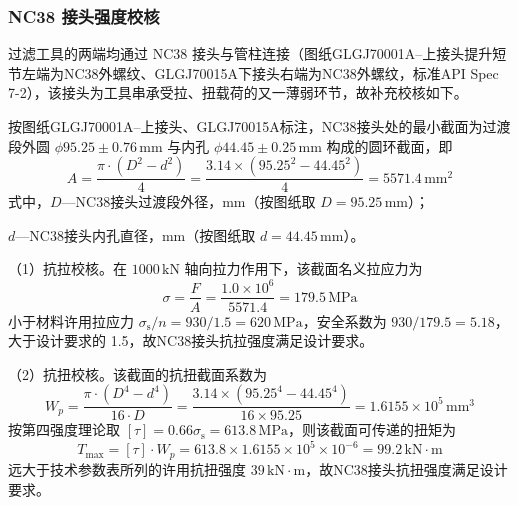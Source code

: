 \subsubsection{NC38 接头强度校核}

过滤工具的两端均通过 NC38 接头与管柱连接（图纸GLGJ70001A--上接头提升短节左端为NC38外螺纹、GLGJ70015A下接头右端为NC38外螺纹，标准API Spec 7-2），该接头为工具串承受拉、扭载荷的又一薄弱环节，故补充校核如下。

按图纸GLGJ70001A--上接头、GLGJ70015A标注，NC38接头处的最小截面为过渡段外圆 $\phi 95.25\pm0.76\,\text{mm}$ 与内孔 $\phi 44.45\pm0.25\,\text{mm}$ 构成的圆环截面，即
\begin{equation}
    A = \frac{\pi \cdot (D^2 - d^2)}{4} = \frac{3.14 \times (95.25^2 - 44.45^2)}{4} = 5571.4\,\text{mm}^2
\end{equation}
式中，$D$---NC38接头过渡段外径，mm（按图纸取 $D = 95.25$\,mm）；

$d$---NC38接头内孔直径，mm（按图纸取 $d = 44.45$\,mm）。

（1）抗拉校核。在 $1000\,\text{kN}$ 轴向拉力作用下，该截面名义拉应力为
\begin{equation}
    \sigma = \frac{F}{A} = \frac{1.0 \times 10^{6}}{5571.4} = 179.5\,\text{MPa}
\end{equation}
小于材料许用拉应力 $\sigma_{\mathrm{s}}/n = 930/1.5 = 620\,\text{MPa}$，安全系数为 $930/179.5 = 5.18$，大于设计要求的 1.5，故NC38接头抗拉强度满足设计要求。

（2）抗扭校核。该截面的抗扭截面系数为
\begin{equation}
    W_p = \frac{\pi \cdot (D^4 - d^4)}{16 \cdot D} = \frac{3.14 \times (95.25^4 - 44.45^4)}{16 \times 95.25} = 1.6155 \times 10^{5}\,\text{mm}^3
\end{equation}
按第四强度理论取 $[\tau] = 0.66\sigma_{\mathrm{s}} = 613.8\,\text{MPa}$，则该截面可传递的扭矩为
\begin{equation}
    T_{\max} = [\tau] \cdot W_p = 613.8 \times 1.6155 \times 10^{5} \times 10^{-6} = 99.2\,\text{kN}\cdot\text{m}
\end{equation}
远大于技术参数表所列的许用抗扭强度 $39\,\text{kN}\cdot\text{m}$，故NC38接头抗扭强度满足设计要求。

